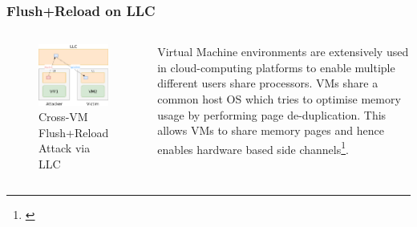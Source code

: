\documentclass[10pt]{beamer}
\begin{document}
\begin{frame}
\frametitle{Flush+Reload on LLC}

\begin{columns}[c]
\begin{figure}
\includegraphics[width=\textwidth]{figures/flush_reload_crossvm}
\caption{Cross-VM Flush+Reload Attack via LLC}
\end{figure}

Virtual Machine environments are extensively used in cloud-computing
platforms to enable multiple different users share processors. VMs share a common host OS
which tries to optimise memory usage by performing page de-duplication. This allows VMs
    to share memory pages and hence enables hardware based side channels\footnote[frame]{\cite{cross_vm}}.
\end{columns}
\end{frame}
\end{document}
